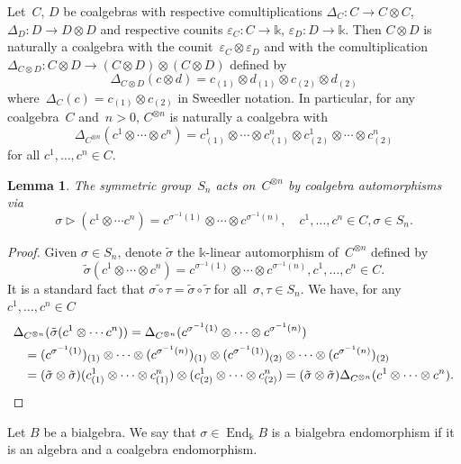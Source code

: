 \documentclass[12pt, reqno]{amsart}
\newtheorem{lemma}[theorem]{Lemma}
\theoremstyle{definition}
\numberwithin{equation}{section}
\newcommand{\tensor}{\otimes}
\newcommand{\kk}{\mathbb{k}}\newcommand{\lie}[1]{{\mathfrak{#1}}}
\DeclareMathOperator{\End}{End}
\begin{document}
Let~$C$, $D$ be coalgebras with respective comultiplications 
$\Delta_C:C\to C\tensor C$, $\Delta_D:D\to D\tensor D$ and respective
counits $\varepsilon_C:C\to\kk$, $\varepsilon_D:D\to \kk$. 
Then $C\tensor D$ is naturally a coalgebra with the
counit~$\varepsilon_C\tensor\varepsilon_D$ and with the
comultiplication $\Delta_{C\tensor D}:C\tensor D\to (C\tensor D)\tensor (C\tensor D)$ defined by
$$
\Delta_{C\tensor D}(c\tensor d)=c_{(1)}\tensor d_{(1)}\tensor c_{(2)}\tensor d_{(2)}
$$
where~$\Delta_C(c)=c_{(1)}\tensor c_{(2)}$ in Sweedler notation.
In particular, for any coalgebra~$C$ and~$n>0$, $C^{\tensor n}$
is naturally a coalgebra with 
$$
\Delta_{C^{\tensor n}}(c^1\tensor\cdots\tensor c^n)=c^1_{(1)}\tensor \cdots \tensor c^n_{(1)}\tensor c^1_{(2)}\tensor \cdots\tensor c^n_{(2)}
$$
for all $c^1,\dots,c^n\in C$.
\begin{lemma}
The symmetric group~$S_n$ acts 
on~$C^{\tensor n}$ by coalgebra automorphisms via
$$
\sigma\triangleright (c^1\tensor\cdots c^n)=c^{\sigma^{-1}(1)}\tensor\cdots \tensor c^{\sigma^{-1}(n)},
\quad c^1,\dots,c^n\in C,\sigma\in S_n.
$$
\end{lemma}
\begin{proof}
Given $\sigma\in S_n$, denote $\tilde\sigma$ the $\kk$-linear automorphism of~$C^{\tensor n}$ defined by
$$
\tilde\sigma(c^1\tensor\cdots\tensor c^n)
=c^{\sigma^{-1}(1)}\tensor\cdots\tensor c^{\sigma^{-1}(n)},
c^1,\dots,c^n\in C.
$$
It is a standard fact that $\widetilde{\sigma\circ\tau}=\tilde\sigma\circ\tilde\tau$ for all~$\sigma,\tau\in S_n$. 
We have, for any $c^1,\dots,c^n\in C$
\begin{align*}
\Delta&_{C^{\tensor n}}(\tilde\sigma(c^1\tensor\cdots c^n))=
\Delta_{C^{\tensor n}}(c^{\sigma^{-1}(1)} \tensor\cdots \tensor c^{\sigma^{-1}(n)})\\
&=(c^{\sigma^{-1}(1)})_{(1)} \tensor\cdots \tensor (c^{\sigma^{-1}(n)})_{(1)}\tensor 
(c^{\sigma^{-1}(1)})_{(2)} \tensor\cdots \tensor (c^{\sigma^{-1}(n)})_{(2)}\\
&=(\tilde\sigma\tensor 
\tilde\sigma)(c^1_{(1)}\tensor\cdots\tensor c^n_{(1)})\tensor (c^1_{(2)}\tensor\cdots\tensor c^n_{(2)})
=(\tilde\sigma\tensor 
\tilde\sigma)\Delta_{C^{\tensor n}}
(c^1\tensor\cdots\tensor c^n)
.\qedhere
\end{align*}
\end{proof}
Let $B$ be a bialgebra. We say that $\sigma\in\End_\kk B$ is a bialgebra endomorphism if it is an algebra and a coalgebra endomorphism. 
\end{document}

